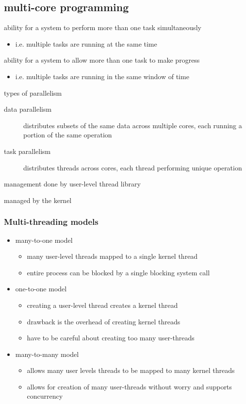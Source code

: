 \documentclass[11pt]{article}
\begin{document}
\subsection{multi-core programming}
\label{sec:org11e4207}
\begin{description}
\item[{parallelism}] ability for a system to perform more than one task simultaneously
\begin{itemize}
\item i.e. multiple tasks are running at the same time
\end{itemize}
\item[{concurrency}] ability for a system to allow more than one task to make progress
\begin{itemize}
\item i.e. multiple tasks are running in the same window of time
\end{itemize}
\item types of parallelism 
\begin{description}
\item[{data parallelism}] distributes subsets of the same data across multiple cores, each running a portion of the same operation
\item[{task parallelism}] distributes threads across cores, each thread performing unique operation
\end{description}
\item[{user threads}] management done by user-level thread library
\item[{kernel threads}] managed by the kernel
\end{description}
\subsubsection{Multi-threading models}
\label{sec:org63f6a35}
\begin{itemize}
\item many-to-one model
\begin{itemize}
\item many user-level threads mapped to a single kernel thread
\item entire process can be blocked by a single blocking system call
\end{itemize}
\item one-to-one model
\begin{itemize}
\item creating a user-level thread creates a kernel thread
\item drawback is the overhead of creating kernel threads
\item have to be careful about creating too many user-threads
\end{itemize}
\item many-to-many model
\begin{itemize}
\item allows many user levels threads to be mapped to many kernel threads
\item allows for creation of many user-threads without worry and supports concurrency
\end{itemize}
\end{itemize}
\end{document}
